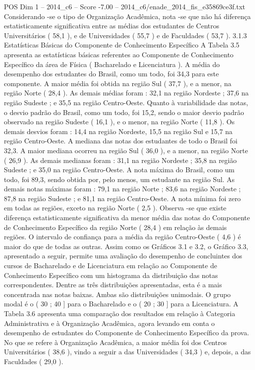 \begin{textsample}{POS Dim 1 – 2014\_c6 – Score -7.00 – 2014\_c6/enade\_2014\_fis\_e35869ce3f.txt}
Considerando -se o tipo de Organização Acadêmica, nota -se que não há diferença estatisticamente significativa entre as médias dos estudantes de Centros Universitários ( 58,1 ), e de Universidades ( 55,7 ) e de Faculdades ( 53,7 ). 3.1.3 Estatísticas Básicas do Componente de Conhecimento Específico A Tabela 3.5 apresenta as estatísticas básicas referentes ao Componente de Conhecimento Específico da área de Física ( Bacharelado e Licenciatura ).
A média do desempenho dos estudantes do Brasil, como um todo, foi 34,3 para este componente.
A maior média foi obtida na região Sul ( 37,7 ), e a menor, na região Norte ( 28,4 ).
As demais médias foram : 32,1 na região Nordeste ; 37,6 na região Sudeste ; e 35,5 na região Centro-Oeste.
Quanto à variabilidade das notas, o desvio padrão do Brasil, como um todo, foi 15,2, sendo o maior desvio padrão observado na região Sudeste ( 16,1 ), e o menor, na região Norte ( 11,8 ).
Os demais desvios foram : 14,4 na região Nordeste, 15,5 na região Sul e 15,7 na região Centro-Oeste.
A mediana das notas dos estudantes de todo o Brasil foi 32,3.
A maior mediana ocorreu na região Sul ( 36,0 ), e a menor, na região Norte ( 26,9 ).
As demais medianas foram : 31,1 na região Nordeste ; 35,8 na região Sudeste ; e 35,0 na região Centro-Oeste.
A nota máxima do Brasil, como um todo, foi 89,3, sendo obtida por, pelo menos, um estudante na região Sul.
As demais notas máximas foram : 79,1 na região Norte ; 83,6 na região Nordeste ; 87,8 na região Sudeste ; e 81,1 na região Centro-Oeste.
A nota mínima foi zero em todas as regiões, exceto na região Norte ( 2,5 ).
Observa -se que existe diferença estatisticamente significativa da menor média das notas do Componente de Conhecimento Específico da região Norte ( 28,4 ) em relação às demais regiões.
O intervalo de confiança para a média da região Centro-Oeste ( 4,6 ) é maior do que de todas as outras.
Assim como os Gráficos 3.1 e 3.2, o Gráfico 3.3, apresentado a seguir, permite uma avaliação do desempenho de concluintes dos cursos de Bacharelado e de Licenciatura em relação ao Componente de Conhecimento Específico com um histograma da distribuição das notas correspondentes.
Dentre as três distribuições apresentadas, esta é a mais concentrada nas notas baixas.
Ambas são distribuições unimodais.
O grupo modal é o ( 30 ; 40 ] para o Bacharelado e o ( 20 ; 30 ] para a Licenciatura.
A Tabela 3.6 apresenta uma comparação dos resultados em relação à Categoria Administrativa e à Organização Acadêmica, agora levando em conta o desempenho de estudantes do Componente de Conhecimento Específico da prova.
No que se refere à Organização Acadêmica, a maior média foi dos Centros Universitários ( 38,6 ), vindo a seguir a das Universidades ( 34,3 ) e, depois, a das Faculdades ( 29,0 ).

\end{textsample}
